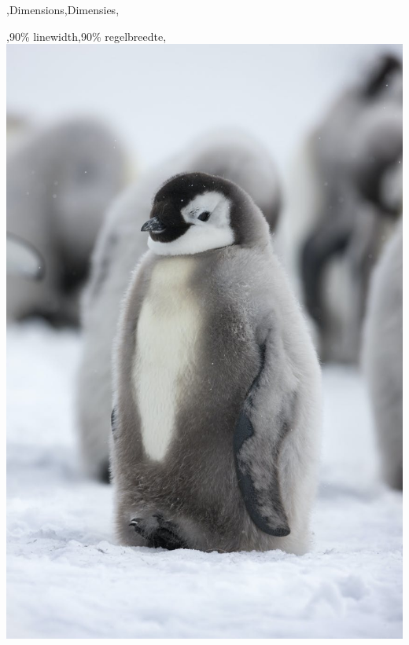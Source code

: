 \begin{frame}[fragile]{\lang,Dimensions,Dimensies,}
\begin{noindentlist}
        \item \lang,90\% linewidth,90\% regelbreedte,\\
        \texttt{\includegraphics[width=0.9\linewidth]{pinguin.jpg}}
        
    \end{noindentlist}
\end{frame}
